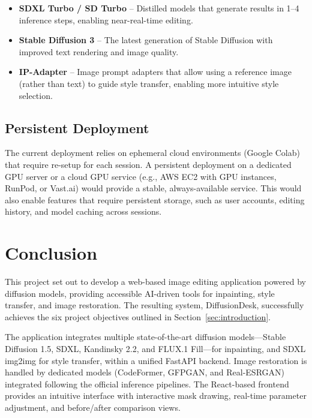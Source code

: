 \documentclass[12pt,a4paper]{report}
\begin{document}
\begin{itemize}
    \item \textbf{SDXL Turbo / SD Turbo} -- Distilled models that generate results in 1--4 inference steps, enabling near-real-time editing.
    \item \textbf{Stable Diffusion 3} -- The latest generation of Stable Diffusion with improved text rendering and image quality.
    \item \textbf{IP-Adapter} -- Image prompt adapters that allow using a reference image (rather than text) to guide style transfer, enabling more intuitive style selection.
\end{itemize}

\subsection{Persistent Deployment}

The current deployment relies on ephemeral cloud environments (Google Colab) that require re-setup for each session. A persistent deployment on a dedicated GPU server or a cloud GPU service (e.g., AWS EC2 with GPU instances, RunPod, or Vast.ai) would provide a stable, always-available service. This would also enable features that require persistent storage, such as user accounts, editing history, and model caching across sessions.

\newpage

\section{Conclusion}

This project set out to develop a web-based image editing application powered by diffusion models, providing accessible AI-driven tools for inpainting, style transfer, and image restoration. The resulting system, DiffusionDesk, successfully achieves the six project objectives outlined in Section~\ref{sec:introduction}.

The application integrates multiple state-of-the-art diffusion models---Stable Diffusion 1.5, SDXL, Kandinsky 2.2, and FLUX.1 Fill---for inpainting, and SDXL img2img for style transfer, within a unified FastAPI backend. Image restoration is handled by dedicated models (CodeFormer, GFPGAN, and Real-ESRGAN) integrated following the official inference pipelines. The React-based frontend provides an intuitive interface with interactive mask drawing, real-time parameter adjustment, and before/after comparison views.
\end{document}
